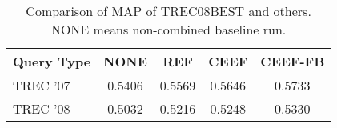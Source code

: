 \begin{table}[h]
	\centering
	\begin{tabular}{lS[tabnumalign=centre,tabformat=1.4,decimalsymbol=comma]S[tabnumalign=centre,tabformat=1.4,decimalsymbol=comma]S[tabnumalign=centre,tabformat=1.4,decimalsymbol=comma]S[tabnumalign=centre,tabformat=1.4,decimalsymbol=comma]}
		\toprule
		Query Type & {NONE} & {REF} & {CEEF} & {CEEF-FB}\\
		\midrule
		TREC '07 & 0.5406 & 0.5569 & 0.5646 & 0.5733\\
		TREC '08 & 0.5032 & 0.5216 & 0.5248 & 0.5330\\
		\bottomrule
	\end{tabular}
	\caption{Comparison of MAP of TREC08BEST and others. NONE means non-combined baseline run.}
	\cite{paper:Na}
\end{table}\\
\\
